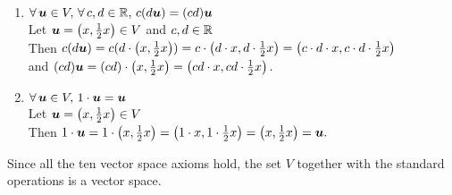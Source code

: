 \documentclass{report}
\begin{document}
{\begin{enumerate}
        \item \( \forall\, \boldsymbol{u} \in V,\, \forall\, c, d \in  \mathbb{R},\, c(d\boldsymbol{u}) = (cd) \boldsymbol{u} \) \\
                Let \( \boldsymbol{u} = \left( x, \frac{1}{2}x \right) \in V \) and \( c, d \in \mathbb{R} \) \\
                Then \( c(d\boldsymbol{u}) = c(d \cdot \left( x, \frac{1}{2}x \right)) = c \cdot \left( d \cdot x, d \cdot \frac{1}{2}x \right) = \left( c \cdot d \cdot x, c \cdot d \cdot \frac{1}{2}x \right) \) \\
                and \( (cd) \boldsymbol{u} = (cd) \cdot \left( x, \frac{1}{2}x \right) = \left( cd \cdot x, cd \cdot \frac{1}{2}x \right). \)
        \item \( \forall\, \boldsymbol{u} \in V,\, 1 \cdot \boldsymbol{u} = \boldsymbol{u} \) \\
                Let \( \boldsymbol{u} = \left( x, \frac{1}{2}x \right) \in V \) \\
                Then \( 1 \cdot \boldsymbol{u} = 1 \cdot \left( x, \frac{1}{2}x \right) = \left( 1 \cdot x, 1 \cdot \frac{1}{2}x \right) = \left( x, \frac{1}{2}x \right) = \boldsymbol{u}. \)
    \end{enumerate}
    Since all the ten vector space axioms hold, the set \( V \) together with the standard operations is a vector space. 
}
\end{document}
